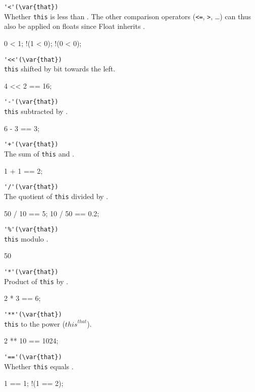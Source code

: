 \begin{urbiscriptapi}
\item \lstinline|'<'(\var{that})|\\
  Whether \lstinline|this| is less than . The other comparison
  operators (\lstinline|<=|, \lstinline|>|, \ldots) can thus also be
  applied on floats since Float inherits .
\begin{urbiassert}
  0 < 1;
!(1 < 0);
!(0 < 0);
\end{urbiassert}

\item \lstinline|'<<'(\var{that})|\\
  \lstinline|this| shifted by  bit towards the left.
\begin{urbiassert}
4 << 2 == 16;
\end{urbiassert}

\item \lstinline|'-'(\var{that})|\\
  \lstinline|this| subtracted by .
\begin{urbiassert}
6 - 3 == 3;
\end{urbiassert}

\item \lstinline|'+'(\var{that})|\\
  The sum of \lstinline|this| and .
\begin{urbiassert}
1 + 1 == 2;
\end{urbiassert}

\item \lstinline|'/'(\var{that})|\\
  The quotient of \lstinline|this| divided by .
\begin{urbiassert}
50 / 10 == 5;
10 / 50 == 0.2;
\end{urbiassert}

\item \lstinline|'%'(\var{that})|\\
  \lstinline|this| modulo .
\begin{urbiassert}
50 %
\end{urbiassert}

\item \lstinline|'*'(\var{that})|\\
  Product of \lstinline|this| by .
\begin{urbiassert}
2 * 3 == 6;
\end{urbiassert}

\item \lstinline|'**'(\var{that})|\\
  \lstinline|this| to the  power (${this}^{that}$).
\begin{urbiassert}
2 ** 10 == 1024;
\end{urbiassert}

\item \lstinline|'=='(\var{that})|\\
  Whether \lstinline|this| equals .
\begin{urbiassert}
  1 == 1;
!(1 == 2);
\end{urbiassert}
\end{urbiscriptapi}

